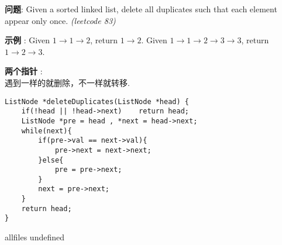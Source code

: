 \documentclass{article}
\begin{document}
\begin{CJK}{UTF8}{gbsn}     %

\else
    
\begin{description}
    \item{\textbf{问题}}: Given a sorted linked list, delete all duplicates such that each element appear only once. \textit{(leetcode 83)}
    \item{\textbf{示例}} : Given $1\rightarrow1\rightarrow2$, return $1\rightarrow2$. Given $1\rightarrow1\rightarrow2\rightarrow3\rightarrow3$, return $1\rightarrow2\rightarrow3$.
    \item{\textbf{两个指针}} : 
    \\遇到一样的就删除，不一样就转移.
    \begin{lstlisting}
ListNode *deleteDuplicates(ListNode *head) {
	if(!head || !head->next)	return head;
	ListNode *pre = head , *next = head->next;
	while(next){
		if(pre->val == next->val){
			pre->next = next->next;
		}else{
			pre = pre->next;
		}
		next = pre->next;
	}
	return head;
}
    \end{lstlisting}
\end{description}

\fi

\ifx allfiles undefined
\end{CJK}
\end{document}
